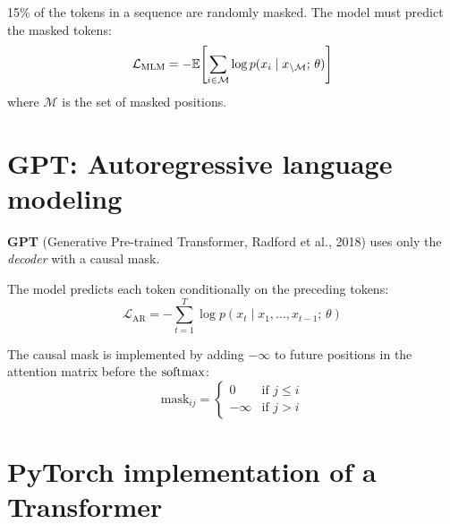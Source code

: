 \begin{definition}
15\% of the tokens in a sequence are randomly masked. The model must predict the masked tokens:
\begin{equation}
\mathcal{L}_{\text{MLM}} = -\mathbb{E}\!\left[\sum_{i \in \mathcal{M}} \log p(x_i \mid x_{\setminus \mathcal{M}};\, \theta)\right]
\end{equation}
where $\mathcal{M}$ is the set of masked positions.
\end{definition}

\section{GPT: Autoregressive language modeling}
\label{sec:gpt}

\textbf{GPT} (Generative Pre-trained Transformer, Radford et al., 2018) uses only the \emph{decoder} with a causal mask.

\begin{definition}
The model predicts each token conditionally on the preceding tokens:
\begin{equation}
\mathcal{L}_{\text{AR}} = -\sum_{t=1}^{T} \log p(x_t \mid x_1, \ldots, x_{t-1};\, \theta)
\end{equation}
\end{definition}

The causal mask is implemented by adding $-\infty$ to future positions in the attention matrix before the $\mathrm{softmax}$:
\begin{equation}
\text{mask}_{ij} = \begin{cases} 0 & \text{if } j \leq i \\ -\infty & \text{if } j > i \end{cases}
\end{equation}

\section{PyTorch implementation of a Transformer}
\label{sec:transformer-pytorch}

